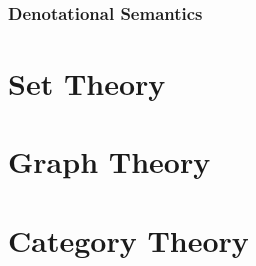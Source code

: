 \documentclass{article}
\begin{document}
\section{Denotational Semantics}

\part{Set Theory}

\part{Graph Theory}

\part{Category Theory}
\end{document}
